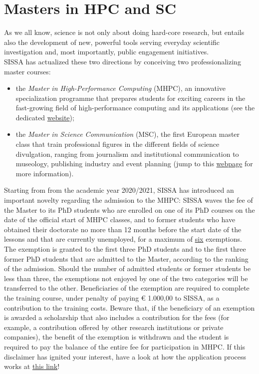 \documentclass{sissavademecum}
\begin{document}
\section{Masters in HPC and SC}

As we all know, science is not only about doing hard-core research, but entails also the development of new, powerful tools serving everyday scientific investigation and, most importantly, public engagement initiatives. \\
SISSA has actualized these two directions by conceiving two professionalizing master courses:
\begin{itemize}
    \item the \textit{Master in High-Performance Computing} (MHPC), an innovative specialization programme that prepares students for exciting careers in the fast-growing field of high-performance computing and its applications (see the dedicated \href{https://www.mhpc.it/}{website});
    \item the \textit{Master in Science Communication} (MSC), the first European master class that train professional figures in the different fields of science divulgation, ranging from journalism and institutional communication to museology, publishing industry and event planning (jump to this \href{https://mcs.sissa.it/}{webpage} for more information).
\end{itemize}
Starting from from the academic year 2020/2021, SISSA has introduced an important novelty regarding the admission to the MHPC: SISSA waves the fee of the Master to its PhD students who are enrolled on one of its PhD courses on the date of the official start of MHPC classes, and to former students who have obtained their doctorate no more than 12 months before the start date of the lessons and that are currently unemployed, for a maximum of \underline{six} exemptions. The exemption is granted to the first three PhD students and to the first three former PhD students that are admitted to the Master, according to the ranking of the admission. Should the number of admitted students or former students be less than three, the exemptions not enjoyed by one of the two categories will be transferred to the other. Beneficiaries of the exemption are required to complete the training course, under penalty of paying € 1.000,00 to SISSA, as a contribution to the training costs. Beware that, if the beneficiary of an exemption is awarded a scholarship that also includes a contribution for the fees (for example, a contribution offered by other research institutions or private companies), the benefit of the exemption is withdrawn and the student is required to pay the balance of the entire fee for participation in MHPC. If this disclaimer has ignited your interest, have a look at how the application process works at \href{https://www.mhpc.it/how-apply}{this link}!
\end{document}

